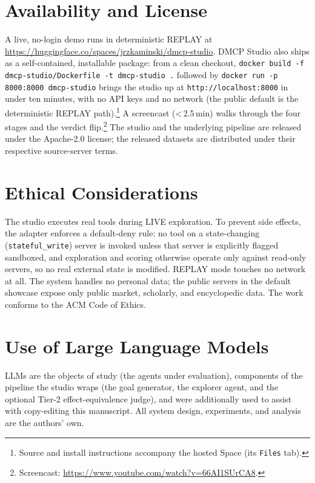\section*{Availability and License}
\label{sec:availability}

A live, no-login demo runs in deterministic REPLAY at
\url{https://huggingface.co/spaces/jrzkaminski/dmcp-studio}. DMCP Studio also
ships as a self-contained, installable package: from a clean checkout,
\texttt{docker build -f dmcp-studio/Dockerfile -t dmcp-studio .} followed by
\texttt{docker run -p 8000:8000 dmcp-studio} brings the studio up at
\texttt{http://localhost:8000} in under ten minutes, with no API keys and no
network (the public default is the deterministic REPLAY path).\footnote{Source
and install instructions accompany the hosted Space (its \texttt{Files} tab).} A screencast
(\textless\,2.5\,min) walks through the four stages and the verdict
flip.\footnote{Screencast: \url{https://www.youtube.com/watch?v=66AI1SUrCA8}.}
The studio and the underlying pipeline are released under the Apache-2.0
license; the released datasets are distributed under their respective
source-server terms.

\section*{Ethical Considerations}

The studio executes real tools during LIVE exploration. To prevent side
effects, the adapter enforces a default-deny rule: no tool on a
state-changing (\texttt{stateful\_write}) server is invoked unless that
server is explicitly flagged sandboxed, and exploration and scoring
otherwise operate only against read-only servers, so no real external state
is modified. REPLAY mode touches no network at all. The system handles no
personal data; the public servers in the default showcase expose only public
market, scholarly, and encyclopedic data. The work conforms to the ACM Code
of Ethics.

\section*{Use of Large Language Models}

LLMs are the objects of study (the agents under evaluation), components of
the pipeline the studio wraps (the goal generator, the explorer agent, and
the optional Tier-2 effect-equivalence judge), and were additionally used to
assist with copy-editing this manuscript. All system design, experiments,
and analysis are the authors' own.
